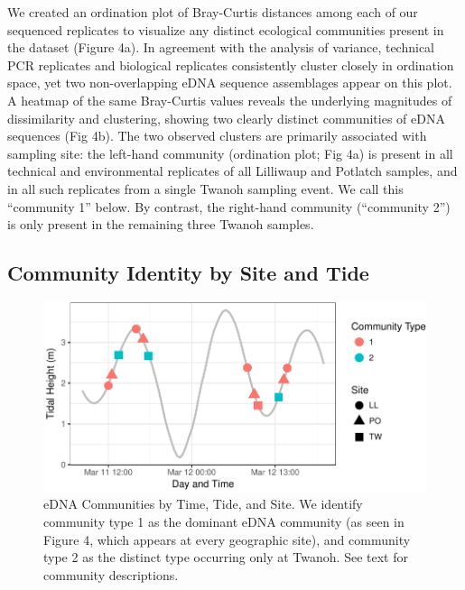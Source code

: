 \documentclass[fleqn,10pt,lineno]{wlpeerj} %
\begin{document}
We created an ordination plot of Bray-Curtis distances among each of our
sequenced replicates to visualize any distinct ecological communities
present in the dataset (Figure 4a). In agreement with the analysis of
variance, technical PCR replicates and biological replicates
consistently cluster closely in ordination space, yet two
non-overlapping eDNA sequence assemblages appear on this plot. A heatmap
of the same Bray-Curtis values reveals the underlying magnitudes of
dissimilarity and clustering, showing two clearly distinct communities
of eDNA sequences (Fig 4b). The two observed clusters are primarily
associated with sampling site: the left-hand community (ordination plot;
Fig 4a) is present in all technical and environmental replicates of all
Lilliwaup and Potlatch samples, and in all such replicates from a single
Twanoh sampling event. We call this ``community 1'' below. By contrast,
the right-hand community (``community 2'') is only present in the
remaining three Twanoh samples.

\subsection{Community Identity by Site and
Tide}\label{community-identity-by-site-and-tide-1}

\begin{figure}[!ht]

{\centering \includegraphics{figures/FIG5_tide_community_figure-1} 

}

\caption{\label{fig:fig5}eDNA Communities by Time, Tide, and Site. We identify community type 1 as the dominant eDNA community (as seen in Figure 4, which appears at every geographic site), and community type 2 as the distinct type occurring only at Twanoh. See text for community descriptions.}\label{fig:FIG5_tide_community_figure}
\end{figure}
\end{document}
